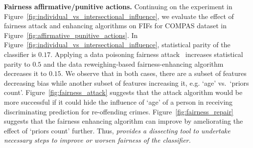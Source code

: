 \noindent\textbf{Fairness affirmative/punitive actions.} Continuing on the experiment in Figure~\ref{fig:individual_vs_intersectional_influence}, we evaluate the effect of fairness attack and enhancing algorithms on FIFs for COMPAS dataset in Figure~\ref{fig:affirmative_punitive_actions}.  In Figure~\ref{fig:individual_vs_intersectional_influence}, statistical parity of the classifier is $ 0.17 $. Applying a data poisoning fairness attack~\cite{solans2020poisoning} increases statistical parity to $ 0.5 $ and the data reweighing-based fairness-enhancing algorithm~\cite{kamiran2012data} decreases it to $ 0.15$. We observe that in both cases, there are a subset of features decreasing bias while another subset of features increasing it, e.g. `age' vs.\ `priors count'. Figure~\ref{fig:fairness_attack} suggests that the attack algorithm would be more successful if it could hide the influence of `age' of a person in receiving discriminating prediction for re-offending crimes. Figure~\ref{fig:fairness_repair} suggests that the fairness enhancing algorithm can improve by ameliorating the effect of `priors count' further. Thus, \textit{{\fairXplainer} provides a dissecting tool to undertake necessary steps to improve or worsen fairness of the classifier.}



